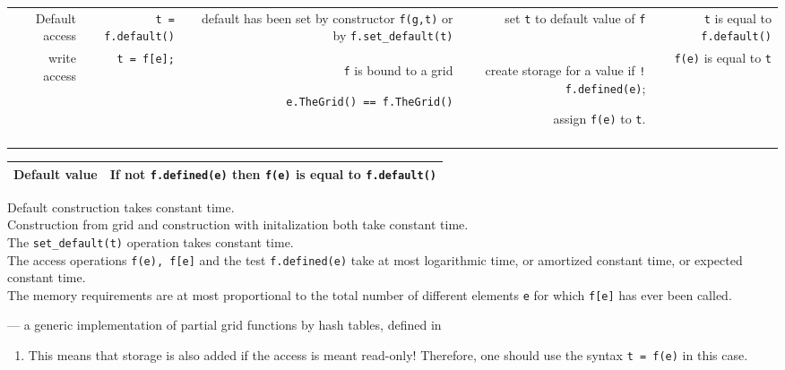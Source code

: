 \begin{tabularx}{15cm}{RRRRR}
    Default access &
    {\tt t = f.default()} &
    default has been set by constructor {\tt f(g,t)} 
    or by  {\tt f.set\_default(t)} &
    set {\tt t} to  default value of {\tt f} &
    {\tt t} is equal to {\tt f.default()} 
   \\
    write access &
    {\tt t = f[e];} &
    {\tt f} is bound to a grid
    \par {\tt e.TheGrid() == f.TheGrid()} &
    create storage for a value
    if  {\tt ! f.defined(e)};
    \par assign  {\tt f(e)} to  {\tt t}. &
    {\tt f(e)} is equal to {\tt t}
   \\
   \hline
   \\
 \end{tabularx}

 \begin{tabular}{ll} 
   \hline
   Default value &
   If not  {\tt f.defined(e)} then  {\tt f(e)} is equal to {\tt f.default()}  
   \\ 
   \hline
 \end{tabular}

 Default construction takes constant time.
 \\
 Construction from grid and construction with initalization both
 take constant time.
 \\
 The {\tt set\_default(t)} operation takes constant time.
 \\
 The access operations {\tt f(e), f[e]} and the test  {\tt f.defined(e)}
 take at most logarithmic time, or amortized constant time, or expected constant time.
 \\
 The memory requirements are at most proportional to the total number of different
 elements {\tt e} for which {\tt f[e]} has ever been called.
 
 --- a generic implementation of partial grid functions by hash tables,
 defined in


 \begin{enumerate}
 \item {}
   This means that storage is also added if the access is meant read-only!
   Therefore, one should use the syntax {\tt t = f(e)} in this case.
 \end{enumerate}
 
  ~
  ~
  ~
  ~
  ~
  

